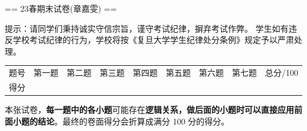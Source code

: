 == 23春期末试卷(章嘉雯) ==

\begin{center}
\end{center}
\begin{center}
\end{center}

\qquad 提示：请同学们秉持诚实守信宗旨，谨守考试纪律，摒弃考试作弊。
学生如有违反学校考试纪律的行为，学校将按《复旦大学学生纪律处分条例》规定予以严肃处理。

\begin{table}
\begin{tabular}{|c|*{7}{C}|c|}
题号 & 第一题 & 第二题 & 第三题 & 第四题 & 第五题 & 第六题 & 第七题 & 总分/100 \\
得分 & & & & & & & & 
\end{tabular}
\end{table}


\qquad 本张试卷，\textbf{每一题中的各小题}可能存在\textbf{逻辑关系，做后面的小题时可以直接应用前面小题的结论}。最终的卷面得分会折算成满分 100 分的得分。


